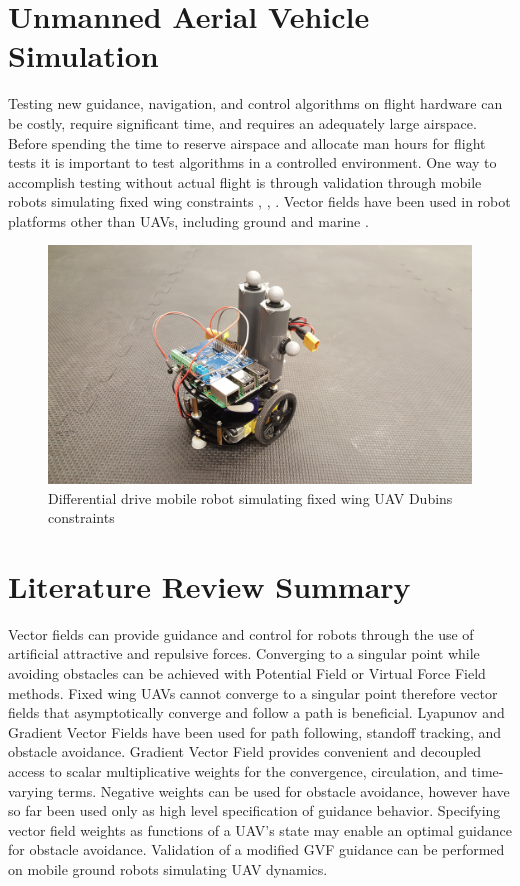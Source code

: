 \documentclass[numbered,pdftex]{ohio-etd}
\begin{document}
\pagebreak
\section{Unmanned Aerial Vehicle Simulation}
Testing new guidance, navigation, and control algorithms on flight hardware can be costly, require significant time, and requires an adequately large airspace. Before spending the time to reserve airspace and allocate man hours for flight tests it is important to test algorithms in a controlled environment. One way to accomplish testing without actual flight is through validation through mobile robots simulating fixed wing constraints \cite{ren_experimental_2007}, \cite{louali_designing_2014}, \cite{louali_experimental_2016}. Vector fields have been used in robot platforms other than UAVs, including ground \cite{kapitanyuk_guiding_2017} and marine \cite{schmitt_obstacle_2016}.

\begin{figure}
	\centering
	\includegraphics[width=15cm]{PaperFigures/robot}
	\caption{Differential drive mobile robot simulating fixed wing UAV Dubins constraints}
	\label{fig:robot}
\end{figure}


\section{Literature Review Summary}


Vector fields can provide guidance and control for robots through the use of artificial attractive and repulsive forces. Converging to a singular point while avoiding obstacles can be achieved with Potential Field or Virtual Force Field methods. Fixed wing UAVs cannot converge to a singular point therefore vector fields that asymptotically converge and follow a path is beneficial. Lyapunov and Gradient Vector Fields have been used for path following, standoff tracking, and obstacle avoidance. Gradient Vector Field provides convenient and decoupled access to scalar multiplicative weights for the convergence, circulation, and time-varying terms. Negative weights can be used for obstacle avoidance, however have so far been used only as high level specification of guidance behavior. Specifying vector field weights as functions of a UAV's state may enable an optimal guidance for obstacle avoidance. Validation of a modified GVF guidance can be performed on mobile ground robots simulating UAV dynamics.
\end{document}
